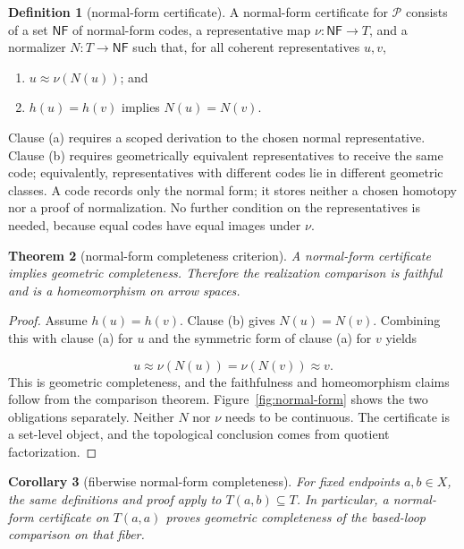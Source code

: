 \documentclass[10pt,reqno]{amsart}
\theoremstyle{definition}
\newtheorem{definition}{Definition}[section]
\theoremstyle{plain}
\newtheorem{theorem}[definition]{Theorem}
\newtheorem{corollary}[definition]{Corollary}
\theoremstyle{remark}
\newcommand{\FigureAltText}[1]{\par\smallskip{\small\textbf{Alt text:} #1\par}}
\newcommand{\MainFigure}[2]{%
  \begingroup\let\SavedFigureCaption\caption
  \renewcommand{\caption}[1]{\SavedFigureCaption{##1}\FigureAltText{#2}}%
  \endgroup}
\begin{document}
\begin{definition}[normal-form certificate]
A normal-form certificate for $\mathcal P$ consists of a set
$\mathsf{NF}$ of normal-form codes, a representative map
$\nu:\mathsf{NF}\to T$, and a normalizer $N:T\to\mathsf{NF}$ such that,
for all coherent representatives $u,v$,
\begin{enumerate}[label=(\alph*),leftmargin=2.2em]
\item $u\approx\nu(N(u))$; and
\item $h(u)=h(v)$ implies $N(u)=N(v)$.
\end{enumerate}

Clause (a) requires a scoped derivation to the chosen normal representative.
Clause (b) requires geometrically equivalent representatives to receive the
same code; equivalently, representatives with different codes lie in
different geometric classes.
A code records only the normal form; it stores neither a chosen homotopy nor
a proof of normalization.  No further condition on the representatives is
needed, because equal codes have equal images under $\nu$.

\end{definition}

\begin{theorem}[normal-form completeness criterion]\label{thm:normal-form-completeness}
A normal-form certificate implies geometric completeness.  Therefore
the realization comparison is faithful and is a homeomorphism on arrow spaces.
\end{theorem}

\begin{proof}
Assume $h(u)=h(v)$.  Clause (b) gives
$N(u)=N(v)$.  Combining this with clause (a) for $u$ and the symmetric form
of clause (a) for $v$ yields

\[
  u\approx\nu(N(u))=\nu(N(v))\approx v.
\]
This is geometric completeness, and the faithfulness and homeomorphism
claims follow from the comparison theorem.  Figure~\ref{fig:normal-form}
shows the two obligations separately.  Neither $N$ nor $\nu$ needs to be
continuous.  The certificate is a set-level object, and the topological
conclusion comes from quotient factorization.
\end{proof}

\MainFigure{normal-form}{Syntactic normalization connects a trace to its normal form; geometric separation says homotopic normal forms have the same index.}

\begin{corollary}[fiberwise normal-form completeness]\label{cor:fiberwise-normal-form}
For fixed endpoints $a,b\in X$, the same definitions and proof apply to
$T(a,b)\subseteq T$.
In particular, a normal-form certificate on $T(a,a)$ proves geometric
completeness of the based-loop comparison on that fiber.
\end{corollary}
\end{document}
